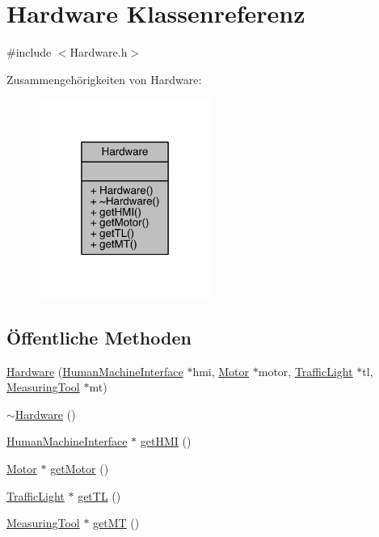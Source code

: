\hypertarget{class_hardware}{}\section{Hardware Klassenreferenz}
\label{class_hardware}


{\ttfamily \#include $<$Hardware.\+h$>$}



Zusammengehörigkeiten von Hardware\+:
\nopagebreak
\begin{figure}[H]
\begin{center}
\leavevmode
\includegraphics[width=160pt]{class_hardware__coll__graph}
\end{center}
\end{figure}
\subsection*{Öffentliche Methoden}
\begin{DoxyCompactItemize}
\item 
\hyperlink{class_hardware_a554fd479b788d6d73473aceb117f17d8}{Hardware} (\hyperlink{class_human_machine_interface}{Human\+Machine\+Interface} $\ast$hmi, \hyperlink{class_motor}{Motor} $\ast$motor, \hyperlink{class_traffic_light}{Traffic\+Light} $\ast$tl, \hyperlink{class_measuring_tool}{Measuring\+Tool} $\ast$mt)
\item 
\hyperlink{class_hardware_a92901a44130552d28485409bcf6906f5}{$\sim$\+Hardware} ()
\item 
\hyperlink{class_human_machine_interface}{Human\+Machine\+Interface} $\ast$ \hyperlink{class_hardware_aec8f013270ef5d6e79afed214b5c18cf}{get\+H\+MI} ()
\item 
\hyperlink{class_motor}{Motor} $\ast$ \hyperlink{class_hardware_a0a896143b14292ea1805d43e384b4fa1}{get\+Motor} ()
\item 
\hyperlink{class_traffic_light}{Traffic\+Light} $\ast$ \hyperlink{class_hardware_a558325fc00a829ca20112234a961b153}{get\+TL} ()
\item 
\hyperlink{class_measuring_tool}{Measuring\+Tool} $\ast$ \hyperlink{class_hardware_a6acc1b03b3c39ddbd681058f49e9f1bd}{get\+MT} ()
\end{DoxyCompactItemize}



